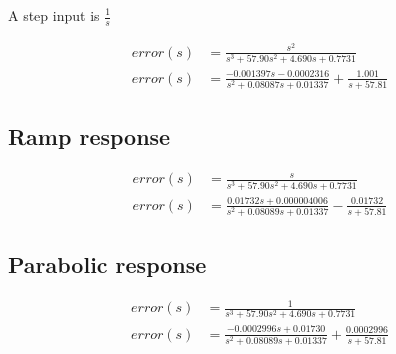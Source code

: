 A step input is $\frac{1}{s}$

\begin{align}
error(s) &= \frac{s^2}{s^3 +57.90 s^2 + 4.690 s +0.7731}\\
error(s) &=\frac{-0.001397 s - 0.0002316}{s^2 + 0.08087 s + 0.01337} + \frac{1.001}{s + 57.81}
\end{align}

\subsection{Ramp response}

\begin{align}
error(s) &= \frac{s}{s^3 +57.90 s^2 + 4.690 s +0.7731}\\
error(s) &= \frac{0.01732 s + 0.000004006}{s^2 +0.08089 s +0.01337} - \frac{0.01732}{s + 57.81}
\end{align}

\subsection{Parabolic response}

\begin{align}
error(s) &= \frac{1}{s^3 +57.90 s^2 + 4.690 s +0.7731}\\
error(s) &= \frac{-0.0002996 s + 0.01730}{s^2 + 0.08089 s + 0.01337}+\frac{0.0002996}{s+ 57.81}
\end{align}


